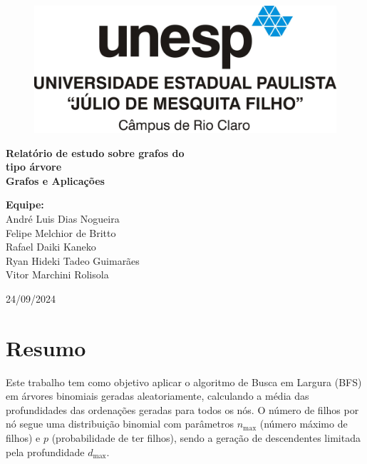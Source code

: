 \documentclass[12pt, a4paper]{scrreprt}
\begin{document}
\begin{titlepage}
    \centering
    \begin{figure}[h]
        \centering
        \includegraphics[width=.75\textwidth]{src/logo_unesp.jpg}
        \label{fig:logo_unesp}
    \end{figure}
    \vfill
    \Huge\textbf{Relatório de estudo sobre grafos do \\ tipo árvore}\\[1.5cm]
    \Large\textbf{Grafos e Aplicações}\\[1.5cm]
    \vfill
    \begin{flushleft}
        \textbf{Equipe:}\\
        \hspace{1.5cm}André Luis Dias Nogueira \\ 
        \hspace{1.5cm}Felipe Melchior de Britto \\
        \hspace{1.5cm}Rafael Daiki Kaneko \\
        \hspace{1.5cm}Ryan Hideki Tadeo Guimarães \\
        \hspace{1.5cm}Vitor Marchini Rolisola \\
    \end{flushleft}
    \vfill
    24/09/2024\\
\end{titlepage}

\tableofcontents
\newpage

\chapter{Resumo}

Este trabalho tem como objetivo aplicar o algoritmo de Busca em Largura (BFS) em árvores binomiais geradas aleatoriamente, calculando a média das profundidades das ordenações geradas para todos os nós. O número de filhos por nó segue uma distribuição binomial com parâmetros \( n_{\text{max}} \) (número máximo de filhos) e \( p\) (probabilidade de ter filhos), sendo a geração de descendentes limitada pela profundidade \( d_{\text{max}} \).
\end{document}
